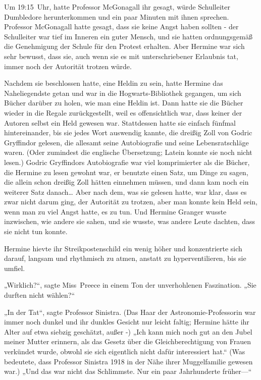 {Um 19:15~Uhr, hatte Professor McGonagall ihr gesagt, würde Schulleiter Dumbledore herunterkommen und ein paar Minuten mit ihnen sprechen. Professor McGonagall hatte gesagt, dass sie keine Angst haben sollten - der Schulleiter war tief im Inneren ein guter Mensch, und sie hatten ordnungsgemäß die Genehmigung der Schule für den Protest erhalten. Aber Hermine war sich sehr bewusst, dass sie, auch wenn sie es mit unterschriebener Erlaubnis tat, immer noch der Autorität trotzen würde.

Nachdem sie beschlossen hatte, eine Heldin zu sein, hatte Hermine das Naheliegendste getan und war in die Hogwarts-Bibliothek gegangen, um sich Bücher darüber zu holen, wie man eine Heldin ist. Dann hatte sie die Bücher wieder in die Regale zurückgestellt, weil es offensichtlich war, dass keiner der Autoren selbst ein Held gewesen war. Stattdessen hatte sie einfach fünfmal hintereinander, bis sie jedes Wort auswendig kannte, die dreißig Zoll von Godric Gryffindor gelesen, die allesamt seine Autobiografie und seine Lebensratschläge waren. (Oder zumindest die englische Übersetzung; Latein konnte sie noch nicht lesen.) Godric Gryffindors Autobiografie war viel komprimierter als die Bücher, die Hermine zu lesen gewohnt war, er benutzte einen Satz, um Dinge zu sagen, die allein schon dreißig Zoll hätten einnehmen müssen, und dann kam noch ein weiterer Satz danach… Aber nach dem, was sie gelesen hatte, war klar, dass es zwar nicht darum ging, der Autorität zu trotzen, aber man konnte kein Held sein, wenn man zu viel Angst hatte, es zu tun. Und Hermine Granger wusste inzwischen, wie andere sie sahen, und sie wusste, was andere Leute dachten, dass sie nicht tun konnte.

Hermine hievte ihr Streikpostenschild ein wenig höher und konzentrierte sich darauf, langsam und rhythmisch zu atmen, anstatt zu hyperventilieren, bis sie umfiel.

„Wirklich?“, sagte Miss~Preece in einem Ton der unverhohlenen Faszination. „Sie durften nicht wählen?“

„In der Tat“, sagte Professor Sinistra. (Das Haar der Astronomie-Professorin war immer noch dunkel und ihr dunkles Gesicht nur leicht faltig; Hermine hätte ihr Alter auf etwa siebzig geschätzt, außer -) „Ich kann mich noch gut an den Jubel meiner Mutter erinnern, als das Gesetz über die Gleichberechtigung von Frauen verkündet wurde, obwohl sie sich eigentlich nicht dafür interessiert hat.“ (Was bedeutete, dass Professor Sinistra 1918 in der Nähe ihrer Muggelfamilie gewesen war.) „Und das war nicht das Schlimmste. Nur ein paar Jahrhunderte früher—“

}
